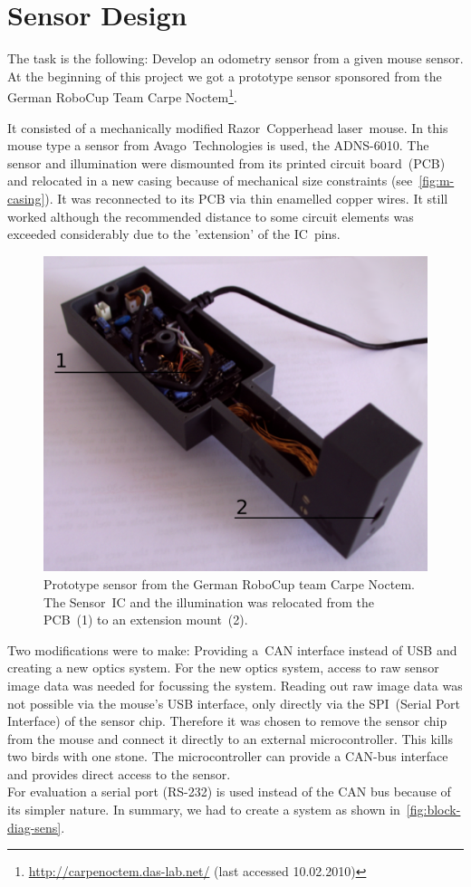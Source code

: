 \documentclass[12pt,a4paper]{article}
\begin{document}

\clearpage
\section{Sensor Design}

The task is the following: Develop an odometry sensor from a given mouse sensor.
At the beginning of this project we got a prototype sensor sponsored from the German RoboCup Team Carpe Noctem\footnote{\url{http://carpenoctem.das-lab.net/} (last accessed 10.02.2010)}.

It consisted of a mechanically modified Razor~Copperhead laser~mouse.
In this mouse type a sensor from Avago~Technologies is used, the ADNS-6010.
The sensor and illumination were dismounted from its printed circuit board~(PCB) and relocated in a new casing because of mechanical size constraints (see~\autoref{fig:m-casing}).
It was reconnected to its PCB via thin enamelled copper wires.
It still worked although the recommended distance to some circuit elements was exceeded considerably due to the 'extension' of the IC~pins.

\begin{figure}[hb]
\begin{center}  
\includegraphics[width=0.6\columnwidth]{figures/proto.pdf}
\caption{\label{fig:m-casing}
Prototype sensor from the German RoboCup team Carpe Noctem.
The Sensor~IC and the illumination was relocated from the PCB~(1) to an extension mount~(2).
}   
\end{center}
\end{figure}

Two modifications were to make: Providing a~CAN interface instead of USB and creating a new optics system.
For the new optics system, access to raw sensor image data was needed for focussing the system.
Reading out raw image data was not possible via the mouse's USB interface, only directly via the SPI~(Serial Port Interface) of the sensor chip.
Therefore it was chosen to remove the sensor chip from the mouse and connect it directly to an external microcontroller.
This kills two birds with one stone.
The microcontroller can provide a CAN-bus interface and provides direct access to the sensor.\\
For evaluation a serial port (RS-232) is used instead of the CAN bus because of its simpler nature.
In summary, we had to create a system as shown in~\autoref{fig:block-diag-sens}.
\end{document}
